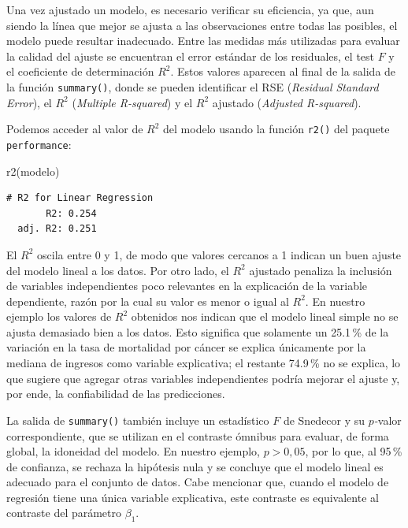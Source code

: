\documentclass[
  spanish,
  a4paper,
]{scrbook}
\newenvironment{Shaded}{\begin{snugshade}}{\end{snugshade}}
\newcommand{\FunctionTok}[1]{\textcolor[rgb]{0.28,0.35,0.67}{#1}}
\newcommand{\NormalTok}[1]{\textcolor[rgb]{0.00,0.23,0.31}{#1}}
\begin{document}
Una vez ajustado un modelo, es necesario verificar su eficiencia, ya
que, aun siendo la línea que mejor se ajusta a las observaciones entre
todas las posibles, el modelo puede resultar inadecuado. Entre las
medidas más utilizadas para evaluar la calidad del ajuste se encuentran
el error estándar de los residuales, el test \(F\) y el coeficiente de
determinación \(R^2\). Estos valores aparecen al final de la salida de
la función \texttt{summary()}, donde se pueden identificar el RSE
(\emph{Residual Standard Error}), el \(R^2\) (\emph{Multiple R-squared})
y el \(R^2\) ajustado (\emph{Adjusted R-squared}).

Podemos acceder al valor de \(R^2\) del modelo usando la función
\texttt{r2()} del paquete \texttt{performance}:

\begin{Shaded}
\begin{Highlighting}[]
\FunctionTok{r2}\NormalTok{(modelo)}
\end{Highlighting}
\end{Shaded}

\begin{verbatim}
# R2 for Linear Regression
       R2: 0.254
  adj. R2: 0.251
\end{verbatim}

El \(R^2\) oscila entre 0 y 1, de modo que valores cercanos a 1 indican
un buen ajuste del modelo lineal a los datos. Por otro lado, el \(R^2\)
ajustado penaliza la inclusión de variables independientes poco
relevantes en la explicación de la variable dependiente, razón por la
cual su valor es menor o igual al \(R^2\). En nuestro ejemplo los
valores de \(R^2\) obtenidos nos indican que el modelo lineal simple no
se ajusta demasiado bien a los datos. Esto significa que solamente un
25.1\,\% de la variación en la tasa de mortalidad por cáncer se explica
únicamente por la mediana de ingresos como variable explicativa; el
restante 74.9\,\% no se explica, lo que sugiere que agregar otras
variables independientes podría mejorar el ajuste y, por ende, la
confiabilidad de las predicciones.

La salida de \texttt{summary()} también incluye un estadístico \(F\) de
Snedecor y su \(p\)\emph{-}valor correspondiente, que se utilizan en el
contraste ómnibus para evaluar, de forma global, la idoneidad del
modelo. En nuestro ejemplo, \(p>0,05\), por lo que, al 95\,\% de
confianza, se rechaza la hipótesis nula y se concluye que el modelo
lineal es adecuado para el conjunto de datos. Cabe mencionar que, cuando
el modelo de regresión tiene una única variable explicativa, este
contraste es equivalente al contraste del parámetro \(\beta_1​\).
\end{document}
